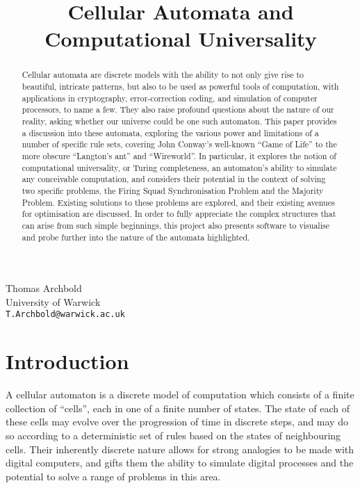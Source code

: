 \documentclass[11pt,a4paper]{article}
\title{Cellular Automata and Computational Universality}
\begin{document}
\maketitle

\begin{center}
    Thomas Archbold \\
    University of Warwick \\
    \texttt{T.Archbold@warwick.ac.uk}
\end{center}

\begin{abstract}
    Cellular automata are discrete models with the ability to not only give rise
    to beautiful, intricate patterns, but also to be used as powerful tools of
    computation, with applications in cryptography, error-correction coding, and
    simulation of computer processors, to name a few. They also raise profound
    questions about the nature of our reality, asking whether our universe could
    be one such automaton. This paper provides a discussion into these automata,
    exploring the various power and limitations of a number of specific rule
    sets, covering John Conway's well-known ``Game of Life'' to the more obscure
    ``Langton's ant'' and ``Wireworld''. In particular, it explores the notion
    of computational universality, or Turing completeness, an automaton's
    ability to simulate any conceivable computation, and considers their
    potential in the context of solving two specific problems, the Firing Squad
    Synchronisation Problem and the Majority Problem. Existing solutions to
    these problems are explored, and their existing avenues for optimisation are
    discussed. In order to fully appreciate the complex structures that can
    arise from such simple beginnings, this project also presents software to
    visualise and probe further into the nature of the automata highlighted.
\end{abstract}

\section{Introduction}
    A cellular automaton is a discrete model of computation which consists of a
    finite collection of ``cells'', each in one of a finite number of states.
    The state of each of these cells may evolve over the progression of time in
    discrete steps, and may do so according to a deterministic set of rules
    based on the states of neighbouring cells. Their inherently discrete nature
    allows for strong analogies to be made with digital computers, and gifts
    them the ability to simulate digital processes and the potential to solve
    a range of problems in this area.
    
\end{document}
